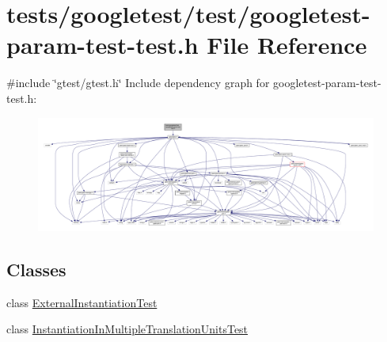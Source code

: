 \hypertarget{googletest-param-test-test_8h}{}\section{tests/googletest/test/googletest-\/param-\/test-\/test.h File Reference}
\label{googletest-param-test-test_8h}
{\ttfamily \#include \char`\"{}gtest/gtest.\+h\char`\"{}}\newline
Include dependency graph for googletest-\/param-\/test-\/test.h\+:\nopagebreak
\begin{figure}[H]
\begin{center}
\leavevmode
\includegraphics[width=350pt]{googletest-param-test-test_8h__incl}
\end{center}
\end{figure}
\subsection*{Classes}
\begin{DoxyCompactItemize}
\item 
class \hyperlink{classExternalInstantiationTest}{External\+Instantiation\+Test}
\item 
class \hyperlink{classInstantiationInMultipleTranslationUnitsTest}{Instantiation\+In\+Multiple\+Translation\+Units\+Test}
\end{DoxyCompactItemize}
